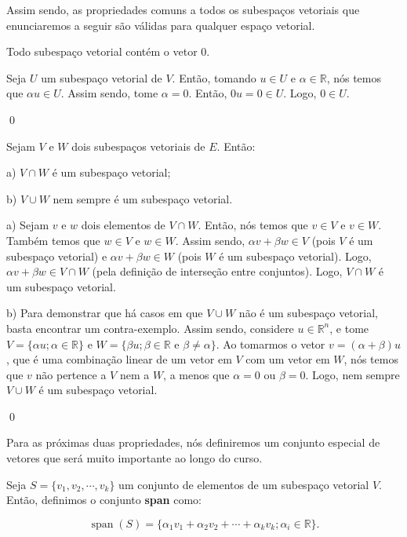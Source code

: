 Assim sendo, as propriedades comuns a todos os subespaços vetoriais que enunciaremos a seguir são válidas para qualquer espaço vetorial.

\begin{Proposition}
	Todo subespaço vetorial contém o vetor $0$.
\end{Proposition}

\begin{Proof}
	Seja $U$ um subespaço vetorial de $V$. Então, tomando $u\in U$ e $\alpha\in\mathbb{R}$, nós temos que $\alpha u\in U$. Assim sendo, tome $\alpha = 0$. Então, $0u = 0\in U$. Logo, $0\in U$.
	
	\qed
\end{Proof}

\begin{Proposition}
	Sejam $V$ e $W$ dois subespaços vetoriais de $E$. Então:
	
	a) $V\cap W$ é um subespaço vetorial;
	
	b) $V\cup W$ nem sempre é um subespaço vetorial.
\end{Proposition}

\begin{Proof}
	a) Sejam $v$ e $w$ dois elementos de $V\cap W$. Então, nós temos que $v\in V$ e $v\in W$. Também temos que $w\in V$ e $w\in W$. Assim sendo, $\alpha v + \beta w \in V$ (pois $V$ é um subespaço vetorial) e $\alpha v + \beta w \in W$ (pois $W$ é um subespaço vetorial). Logo, $\alpha v + \beta w \in V\cap W$ (pela definição de interseção entre conjuntos). Logo, $V\cap W$ é um subespaço vetorial.
	
	b) Para demonstrar que há casos em que $V\cup W$ não é um subespaço vetorial, basta encontrar um contra-exemplo. Assim sendo, considere $u\in\mathbb{R}^n$, e tome $V = \{\alpha u; \alpha\in\mathbb{R}\}$ e $W = \{\beta u; \beta\in\mathbb{R}\text{ e }\beta\neq\alpha\}$. Ao tomarmos o vetor $v = (\alpha + \beta)u$, que é uma combinação linear de um vetor em $V$ com um vetor em $W$, nós temos que $v$ não pertence a $V$ nem a $W$, a menos que $\alpha = 0$ ou $\beta = 0$. Logo, nem sempre $V\cup W$ é um subespaço vetorial.
	
	\qed
\end{Proof}

Para as próximas duas propriedades, nós definiremos um conjunto especial de vetores que será muito importante ao longo do curso.

\begin{Definition}[span]
	Seja $S = \{v_1, v_2, \cdots, v_k\}$ um conjunto de elementos de um subespaço vetorial $V$. Então, definimos o conjunto \textbf{span} como:
	
	$$
	\operatorname{span}(S) = \{\alpha_1v_1 + \alpha_2v_2 + \cdots + \alpha_kv_k; \alpha_i\in\mathbb{R}\}.
	$$
\end{Definition}

